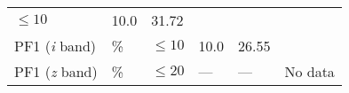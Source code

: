 \documentclass[DM,toc]{lsstdoc}
\begin{document}
\begin{longtable}[]{@{}llllll@{}}
\begin{minipage}[t]{0.17\columnwidth}
\(\leq 10\)\strut
\end{minipage} & \begin{minipage}[t]{0.17\columnwidth}\raggedright\strut
10.0\strut
\end{minipage} & \begin{minipage}[t]{0.12\columnwidth}\raggedright\strut
31.72\strut
\end{minipage} & \begin{minipage}[t]{0.17\columnwidth}\raggedright\strut
\strut
\end{minipage}\tabularnewline
\begin{minipage}[t]{0.14\columnwidth}\raggedright\strut
PF1 (\emph{i} band)\strut
\end{minipage} & \begin{minipage}[t]{0.06\columnwidth}\raggedright\strut
\%\strut
\end{minipage} & \begin{minipage}[t]{0.17\columnwidth}\raggedright\strut
\(\leq 10\)\strut
\end{minipage} & \begin{minipage}[t]{0.17\columnwidth}\raggedright\strut
10.0\strut
\end{minipage} & \begin{minipage}[t]{0.12\columnwidth}\raggedright\strut
26.55\strut
\end{minipage} & \begin{minipage}[t]{0.17\columnwidth}\raggedright\strut
\strut
\end{minipage}\tabularnewline
\begin{minipage}[t]{0.14\columnwidth}\raggedright\strut
PF1 (\emph{z} band)\strut
\end{minipage} & \begin{minipage}[t]{0.06\columnwidth}\raggedright\strut
\%\strut
\end{minipage} & \begin{minipage}[t]{0.17\columnwidth}\raggedright\strut
\(\leq 20\)\strut
\end{minipage} & \begin{minipage}[t]{0.17\columnwidth}\raggedright\strut
---\strut
\end{minipage} & \begin{minipage}[t]{0.12\columnwidth}\raggedright\strut
---\strut
\end{minipage} & \begin{minipage}[t]{0.17\columnwidth}\raggedright\strut
No data\strut
\end{minipage}\tabularnewline

\end{longtable}
\end{document}
